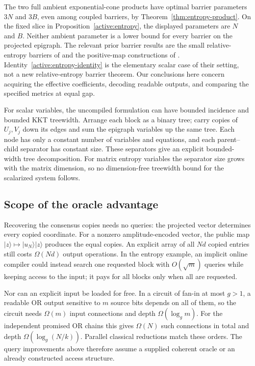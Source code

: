The two full ambient exponential-cone products have optimal barrier
parameters $3N$ and $3B$, even among coupled barriers, by
Theorem~\ref{thm:entropy-product}. On the fixed slice in
Proposition~\ref{active:entropy}, the displayed parameters are $N$
and $B$. Neither ambient parameter is a lower bound for every barrier
on the projected epigraph. The relevant prior barrier results are the
small relative-entropy barriers of \citet{FS2023} and the positive-map
constructions of \citet{HeSaundersonFawzi2026}.
Identity~\eqref{active:entropy-identity} is the elementary scalar case
of their setting, not a new relative-entropy barrier theorem. Our
conclusions here concern acquiring the effective coefficients, decoding
readable outputs, and comparing the specified metrics at equal gap.

For scalar variables, the uncompiled formulation can have bounded
incidence and bounded KKT treewidth. Arrange each block as a binary
tree; carry copies of $U_j,V_j$ down its edges and sum the
epigraph variables up the same tree. Each node has only a constant
number of variables and equations, and each parent--child separator
has constant size. These separators give an explicit bounded-width
tree decomposition. For matrix entropy variables the separator size
grows with the matrix dimension, so no dimension-free treewidth bound
for the scalarized system follows.

\subsection{Scope of the oracle advantage}

Recovering the consensus copies needs no queries:
the projected vector determines every copied coordinate. For a nonzero
amplitude-encoded vector, the public map
$|z\rangle\mapsto|u_N\rangle|z\rangle$ produces the equal copies.
An explicit array of all $Nd$ copied entries still costs
$\Omega(Nd)$ output operations. In the entropy example, an implicit
online compiler could instead search one requested block with
$O(\sqrt m)$ queries while keeping access to the input; it pays
for all blocks only when all are requested.

Nor can an explicit input be loaded for free. In a circuit of
fan-in at most $g>1$, a readable OR output sensitive to $m$ source
bits depends on all of them, so the circuit needs $\Omega(m)$ input
connections and depth $\Omega(\log_g m)$.
For the independent promised OR chains this gives $\Omega(N)$ such
connections in total and depth
$\Omega(\log_g(N/k))$. Parallel classical reductions match these
orders. The query improvements above therefore assume a supplied
coherent oracle or an already constructed access structure.

